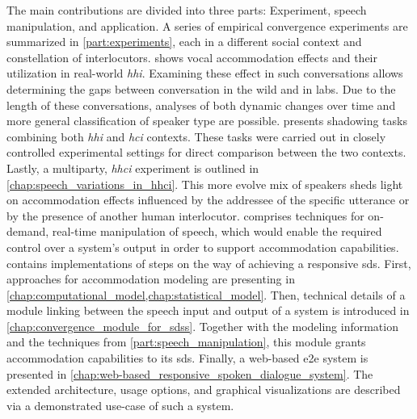 The main contributions are divided into three parts: Experiment, speech manipulation, and application.
A series of empirical convergence experiments are summarized in \cref{part:experiments}, each in a different social context and constellation of interlocutors.
 shows vocal accommodation effects and their utilization in real-world \emph{\acl{hhi}}.
Examining these effect in such conversations  allows determining the gaps between conversation in the wild and in labs.
Due to the length of these conversations, analyses of both dynamic changes over time and more general classification of speaker type are possible.
 presents shadowing tasks combining both \emph{\acl{hhi}} and \emph{\acl{hci}} contexts.
These tasks were carried out in closely controlled experimental settings for direct comparison between the two contexts.
Lastly, a multiparty, \emph{\acl{hhci}} experiment is outlined in \cref{chap:speech_variations_in_hhci}.
This more evolve mix of speakers sheds light on accommodation effects influenced by the addressee of the specific utterance or by the presence of another human interlocutor.
 comprises techniques for on-demand, real-time manipulation of speech, which would enable the required control over a system's output in order to support accommodation capabilities.
\noindent{} contains implementations of steps on the way of achieving a responsive \acl{sds}.
First, approaches for accommodation modeling are presenting in \cref{chap:computational_model,chap:statistical_model}.
Then, technical details of a module linking between the speech input and output of a system is introduced in \cref{chap:convergence_module_for_sdss}.
Together with the modeling information and the techniques from \cref{part:speech_manipulation}, this module grants accommodation capabilities to its \acl{sds}.
Finally, a web-based \acl{e2e} system is presented in \cref{chap:web-based_responsive_spoken_dialogue_system}.
The extended architecture, usage options, and  graphical visualizations are described via a demonstrated use-case of such a system.

\clearpage %
\pagestyle{fancy} %
\renewcommand{\headrulewidth}{0.4pt} %
\renewcommand{\chaptermark}[1]{\markboth{Chapter~\thechapter~--~#1}{}} %
\renewcommand{\sectionmark}[1]{\markright{\thesection\quad#1}} %
\fancyhead[LO]{\leftmark} %
\fancyhead[RE]{\rightmark} %

\addtocounter{page}{1} %
